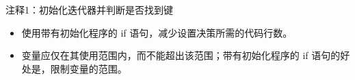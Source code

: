 {\footnotesize
注释1：初始化迭代器并判断是否找到键
}


\begin{itemize}
\item
使用带有初始化程序的 if 语句，减少设置决策所需的代码行数。

\item
变量应仅在其使用范围内，而不能超出该范围；带有初始化程序的 if 语句的好处是，限制变量的范围。
\end{itemize}















